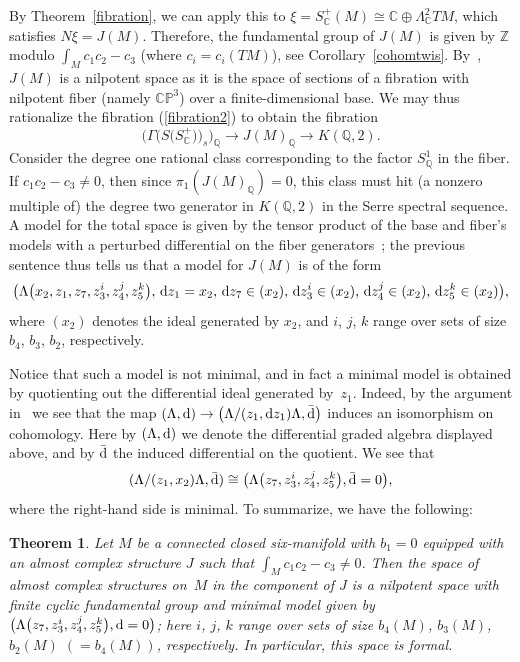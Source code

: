 \documentclass[pdftex]{sigma}%
\newcommand{\CP}{\mathbb{CP}}
\newcommand{\ZZ}{\mathbb{Z}}
\newcommand{\Q}{\mathbb{Q}}
\newcommand{\QQ}{\mathbb{Q}}
\newcommand{\C}{\mathbb{C}}
\numberwithin{equation}{section}
\newtheorem{Theorem}{Theorem}[section]
\begin{document}
By Theorem~\ref{fibration}, we can apply this to $\xi = S_{\C}^+(M) \cong \C \oplus \Lambda_{\C}^2 TM$, which satisfies ${N \xi = J(M)}$. Therefore, the fundamental group of $J(M)$ is given by $\ZZ$ modulo $\int_M\! c_1c_2-c_3$ (where ${c_i \! =\! c_i(TM)}$), see Corollary~\ref{cohomtwis}. By~\cite{M87}, $J(M)$ is a nilpotent space as it is the space of sections of a fibration with nilpotent fiber \big(namely $\CP^3$\big) over a finite-dimensional base. We may thus rationalize the fibration (\ref{fibration2}) to obtain the fibration \[\big(\Gamma\big(S\big(S_{\C}^+\big)\big)_s\big)_{\Q} \to J(M)_{\Q} \to K(\Q, 2).\] Consider the degree one rational class corresponding to the factor $S^1_{\QQ}$ in the fiber. If $c_1c_2 - c_3 \neq 0$, then since $\pi_1(J(M)_\Q) = 0$, this class must hit (a nonzero multiple of) the degree two generator in $K(\Q,2)$ in the Serre spectral sequence. A model for the total space is given by the tensor product of the base and fiber's models with a perturbed differential on the fiber generators~\cite[Section~4]{S77}; the previous sentence thus tells us that a model for $J(M)$ is of the form
\[\big(\Lambda\big(x_2, z_1, z_7, z_3^{i}, z_4^{j}, z_5^{k}\big),\, {\rm d}z_1 = x_2, \, {\rm d}z_7 \in (x_2), \, {\rm d}z_3^i \in (x_2), \, {\rm d}z_4^j \in (x_2),\, {\rm d}z_5^k \in (x_2)\big),
\] where $(x_2)$ denotes the ideal generated by $x_2$, and $i$, $j$, $k$ range over sets of size $b_4$, $b_3$, $b_2$, respectively.

Notice that such a model is not minimal, and in fact a minimal model is obtained by quotienting out the differential ideal generated by~$z_1$. Indeed, by the argument in~\cite[Proposition~2]{VS76} we see that the map $(\Lambda, {\rm d}) \to \big(\Lambda/(z_1, {\rm d}z_1)\Lambda, \bar{{\rm d}}\big)$ induces an isomorphism on cohomology.
Here by $(\Lambda,{\rm d})$ we denote the differential graded algebra displayed above, and by $\bar{{\rm d}}$ the induced differential on the quotient. We see that
\[
(\Lambda/(z_1, x_2)\Lambda, \bar{{\rm d}}) \cong \big(\Lambda\big(z_7, z_3^{i}, z_4^{j}, z_5^{k}\big), \bar{{\rm d}}=0\big),
\] where the right-hand side is minimal. To summarize, we have the following:

\begin{Theorem}\label{Qhomotopy6} Let $M$ be a connected closed six-manifold with $b_1 = 0$ equipped with an almost complex structure $J$ such that $\int_M c_1c_2-c_3 \neq 0$. Then the space of almost complex structures on~$M$ in the component of $J$ is a nilpotent space with finite cyclic fundamental group and minimal model given by $\big(\Lambda\big(z_7, z_3^{i}, z_4^{j}, z_5^{k}\big), {\rm d} = 0\big)$; here $i$, $j$, $k$ range over sets of size $b_4(M)$, $b_3(M)$, $b_2(M)$ $(=b_4(M))$, respectively. In particular, this space is formal.
\end{Theorem}
\end{document}
